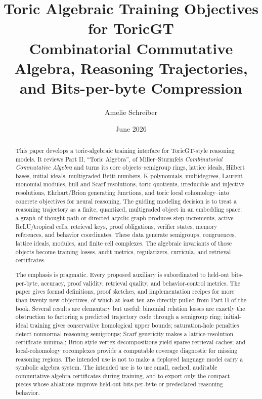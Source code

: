 \documentclass[11pt]{article}
\title{Toric Algebraic Training Objectives for ToricGT\\
\large Combinatorial Commutative Algebra, Reasoning Trajectories, and Bits-per-byte Compression}
\author{Amelie Schreiber}
\date{June 2026}
\theoremstyle{definition}
\begin{document}
\maketitle

\begin{abstract}
This paper develops a toric-algebraic training interface for ToricGT-style reasoning models.  It reviews Part II, ``Toric Algebra'', of Miller--Sturmfels \emph{Combinatorial Commutative Algebra} and turns its core objects--semigroup rings, lattice ideals, Hilbert bases, initial ideals, multigraded Betti numbers, K-polynomials, multidegrees, Laurent monomial modules, hull and Scarf resolutions, toric quotients, irreducible and injective resolutions, Ehrhart/Brion generating functions, and toric local cohomology--into concrete objectives for neural reasoning.  The guiding modeling decision is to treat a reasoning trajectory as a finite, quantized, multigraded object in an embedding space: a graph-of-thought path or directed acyclic graph produces step increments, active ReLU/tropical cells, retrieval keys, proof obligations, verifier states, memory references, and behavior coordinates.  These data generate semigroups, congruences, lattice ideals, modules, and finite cell complexes.  The algebraic invariants of those objects become training losses, audit metrics, regularizers, curricula, and retrieval certificates.

The emphasis is pragmatic.  Every proposed auxiliary is subordinated to held-out bits-per-byte, accuracy, proof validity, retrieval quality, and behavior-control metrics.  The paper gives formal definitions, proof sketches, and implementation recipes for more than twenty new objectives, of which at least ten are directly pulled from Part II of the book.  Several results are elementary but useful: binomial relation losses are exactly the obstruction to factoring a predicted trajectory code through a semigroup ring; initial-ideal training gives conservative homological upper bounds; saturation-hole penalties detect nonnormal reasoning semigroups; Scarf genericity makes a lattice-resolution certificate minimal; Brion-style vertex decompositions yield sparse retrieval caches; and local-cohomology cocomplexes provide a computable coverage diagnostic for missing reasoning regions.  The intended use is not to make a deployed language model carry a symbolic algebra system.  The intended use is to use small, cached, auditable commutative-algebra certificates during training, and to export only the compact pieces whose ablations improve held-out bits-per-byte or predeclared reasoning behavior.
\end{abstract}
\tableofcontents
\newpage
\end{document}
